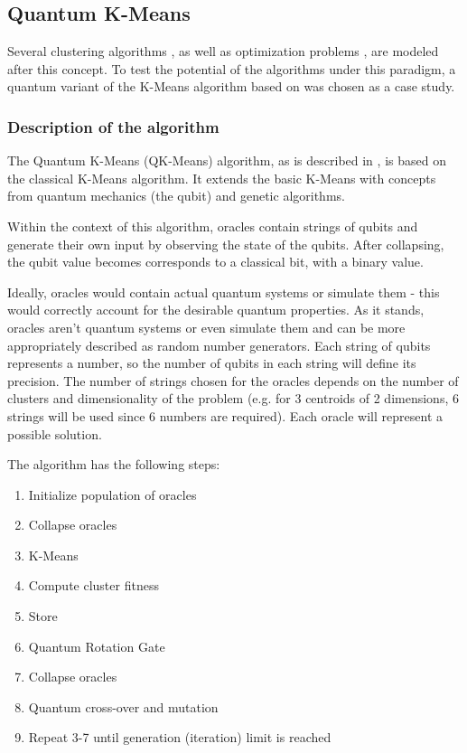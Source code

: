 \subsection{Quantum K-Means}

Several clustering algorithms \cite{Casper2013,Casper,Xiao2010}, as well as optimization problems \cite{Wang2013}, are modeled after this concept.
To test the potential of the algorithms under this paradigm, a quantum variant of the K-Means algorithm based on\cite{Casper} was chosen as a case study.

\subsubsection{Description of the algorithm}

The Quantum K-Means (QK-Means) algorithm, as is described in \cite{Casper}, is based on the classical K-Means algorithm.
It extends the basic K-Means with concepts from quantum mechanics (the qubit) and genetic algorithms.

Within the context of this algorithm, oracles contain strings of qubits and generate their own input by observing the state of the qubits.
After collapsing, the qubit value becomes corresponds to a classical bit, with a binary value.

Ideally, oracles would contain actual quantum systems or simulate them - this would correctly account for the desirable quantum properties.
As it stands, oracles aren't quantum systems or even simulate them and can be more appropriately described as random number generators.
Each string of qubits represents a number, so the number of qubits in each string will define its precision.
The number of strings chosen for the oracles depends on the number of clusters and dimensionality of the problem (e.g. for 3 centroids of 2 dimensions, 6 strings will be used since 6 numbers are required).
Each oracle will represent a possible solution.

The algorithm has the following steps:
\begin{enumerate}
\item Initialize population of oracles
\item Collapse oracles
\item K-Means
\item Compute cluster fitness
\item Store
\item Quantum Rotation Gate
\item Collapse oracles
\item Quantum cross-over and mutation
\item Repeat 3-7 until generation (iteration) limit is reached
\end{enumerate}


